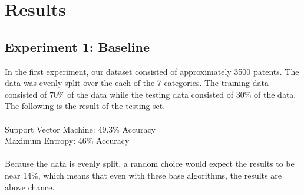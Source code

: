 \section{Results}
\subsection{Experiment 1: Baseline}
In the first experiment, our dataset consisted of approximately 3500 patents.  The data was evenly split over the each of the 7 categories.
The training data consisted of 70\% of the data while the testing data consisted of 30\% of the data.  The following is the result of the testing
set.
\\
\\Support Vector Machine: 49.3\% Accuracy
\\Maximum Entropy: 46\% Accuracy
\\
\\Because the data is evenly split, a random choice would expect the results to be near 14\%, which means that even with these
base algorithms, the results are above chance.
